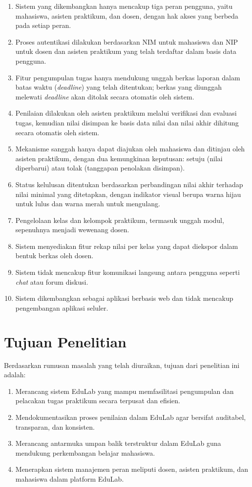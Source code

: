 \documentclass[12pt,a4paper,twoside]{report}
\begin{document}
\begin{enumerate}
    \item Sistem yang dikembangkan hanya mencakup tiga peran pengguna, yaitu mahasiswa, asisten praktikum, dan dosen, dengan hak akses yang berbeda pada setiap peran.
    \item Proses autentikasi dilakukan berdasarkan NIM untuk mahasiswa dan NIP untuk dosen dan asisten praktikum yang telah terdaftar dalam basis data pengguna.
    \item Fitur pengumpulan tugas hanya mendukung unggah berkas laporan dalam batas waktu (\textit{deadline}) yang telah ditentukan; berkas yang diunggah melewati \textit{deadline} akan ditolak secara otomatis oleh sistem.
    \item Penilaian dilakukan oleh asisten praktikum melalui verifikasi dan evaluasi tugas, kemudian nilai disimpan ke basis data nilai dan nilai akhir dihitung secara otomatis oleh sistem.
    \item Mekanisme sanggah hanya dapat diajukan oleh mahasiswa dan ditinjau oleh asisten praktikum, dengan dua kemungkinan keputusan: setuju (nilai diperbarui) atau tolak (tanggapan penolakan disimpan).
    \item Status kelulusan ditentukan berdasarkan perbandingan nilai akhir terhadap nilai minimal yang ditetapkan, dengan indikator visual berupa warna hijau untuk lulus dan warna merah untuk mengulang.
    \item Pengelolaan kelas dan kelompok praktikum, termasuk unggah modul, sepenuhnya menjadi wewenang dosen.
    \item Sistem menyediakan fitur rekap nilai per kelas yang dapat diekspor dalam bentuk berkas oleh dosen.
    \item Sistem tidak mencakup fitur komunikasi langsung antara pengguna seperti \textit{chat} atau forum diskusi.
    \item Sistem dikembangkan sebagai aplikasi berbasis web dan tidak mencakup pengembangan aplikasi seluler.
\end{enumerate}

\section{Tujuan Penelitian}

Berdasarkan rumusan masalah yang telah diuraikan, tujuan dari penelitian ini adalah:

\begin{enumerate}
    \item Merancang sistem EduLab yang mampu memfasilitasi pengumpulan dan pelacakan tugas praktikum secara terpusat dan efisien.
    \item Mendokumentasikan proses penilaian dalam EduLab agar bersifat auditabel, transparan, dan konsisten.
    \item Merancang antarmuka umpan balik terstruktur dalam EduLab guna mendukung perkembangan belajar mahasiswa.
    \item Menerapkan sistem manajemen peran meliputi dosen, asisten praktikum, dan mahasiswa dalam platform EduLab.
\end{enumerate}
\end{document}
